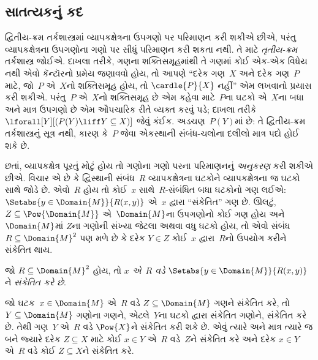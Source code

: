 
\subsection{સાતત્યકનું કદ}\label{sol:set:pow:sec}

\begin{explain}
દ્વિતીય-ક્રમ તર્કશાસ્ત્રમાં વ્યાપકક્ષેત્રના ઉપગણો પર પરિમાણન કરી
શકીએ છીએ, પરંતુ વ્યાપકક્ષેત્રના ઉપગણોના ગણો પર સીધું પરિમાણન કરી
શકતા નથી. તે માટે \emph{તૃતીય-ક્રમ} તર્કશાસ્ત્ર જોઈએ. દાખલા તરીકે,
ગણના શક્તિસમૂહમાંથી તે ગણમાં કોઈ એક-એક વિધેય નથી એવો
કૅન્ટૉરનો પ્રમેય જણાવવો હોય, તો આપણે ``દરેક ગણ~$X$ અને દરેક
ગણ~$P$ માટે, જો~$P$ એ~$X$નો શક્તિસમૂહ હોય, તો
$\cardle{P}{X}$ નહીં'' એમ લખવાનો પ્રયાસ કરી શકીએ. પરંતુ~$P$
એ~$X$નો શક્તિસમૂહ છે એમ કહેવા માટે~$P$ના ઘટકો એ~$X$ના
બધા અને માત્ર ઉપગણો છે એમ ઔપચારિક રીતે વ્યક્ત કરવું પડે; દાખલા
તરીકે $\lforall[Y][(P(Y) \liff Y \subseteq X)]$ જેવું કંઈક.
અડચણ~$P(Y)$માં છે: તે દ્વિતીય-ક્રમ તર્કશાસ્ત્રનું સૂત્ર
નથી, કારણ કે~$P$ જેવા એકસ્થાની સંબંધ-ચલોના દલીલો માત્ર પદો હોઈ
શકે છે.

છતાં, વ્યાપકક્ષેત્ર પૂરતું મોટું હોય તો ગણોના ગણો પરના પરિમાણનનું
\emph{અનુકરણ} કરી શકીએ છીએ. વિચાર એ છે કે દ્વિસ્થાની સંબંધ~$R$
વ્યાપકક્ષેત્રના ઘટકોને વ્યાપકક્ષેત્રના જ ઘટકો સાથે જોડે છે.
એવો~$R$ હોય તો કોઈ~$x$ સાથે~$R$-સંબંધિત બધા ઘટકોનો ગણ લઈએ:
$\Setabs{y \in \Domain{M}}{R(x,y)}$ એ~$x$ દ્વારા
``સંકેતિત'' ગણ છે. ઊલટું, $Z \subseteq \Pow{\Domain{M}}$
એ~$\Domain{M}$ના ઉપગણોનો કોઈ ગણ હોય અને~$\Domain{M}$માં
$Z$ના ગણોની સંખ્યા જેટલા અથવા વધુ ઘટકો હોય, તો એવો
સંબંધ~$R \subseteq \Domain{M}^2$ પણ મળે છે કે દરેક $Y \in Z$
કોઈ~$x$ દ્વારા~$R$નો ઉપયોગ કરીને સંકેતિત થાય.
\end{explain}

\begin{defn}
જો $R \subseteq \Domain{M}^2$ હોય, તો \emph{$x$ એ~$R$ વડે}
$\Setabs{y \in \Domain{M}}{R(x, y)}$ને \emph{સંકેતિત કરે છે}.
\end{defn}

જો ઘટક~$x \in \Domain{M}$ એ~$R$ વડે
$Z \subseteq \Domain{M}$ ગણને સંકેતિત કરે, તો
$Y \subseteq \Domain{M}$ ગણોના ગણને, એટલે~$Y$ના ઘટકો
દ્વારા સંકેતિત ગણોને, સંકેતિત કરે છે. તેથી ગણ~$Y$ એ~$R$ વડે
$\Pow{X}$ને સંકેતિત કરી શકે છે. એવું ત્યારે અને માત્ર ત્યારે જ બને
જ્યારે દરેક $Z \subseteq X$ માટે કોઈ $x \in Y$ એ~$R$ વડે~$Z$ને
સંકેતિત કરે અને દરેક $x \in Y$ એ~$R$ વડે કોઈ $Z \subseteq X$ને
સંકેતિત કરે.

